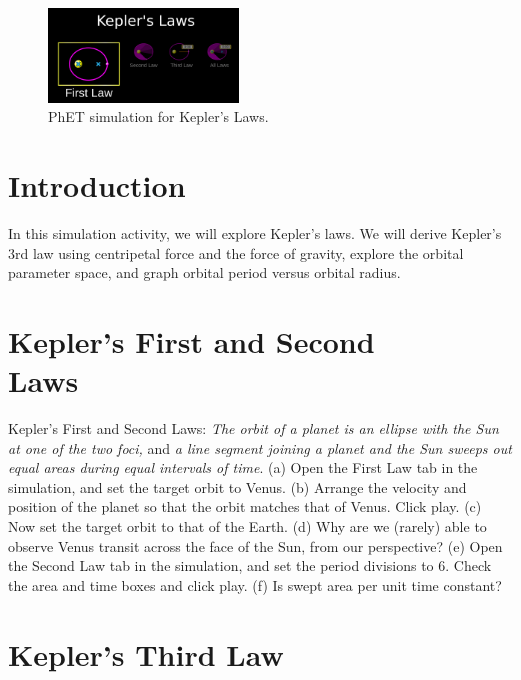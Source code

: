 \documentclass[12pt]{article}
\begin{document}
\twocolumn
\maketitle

\begin{figure}
\centering
\includegraphics[width=0.45\textwidth]{figures/kepler3.png}
\caption{\label{fig:1b} PhET simulation for Kepler's Laws.}
\end{figure}

\section{Introduction}

In this simulation activity, we will explore Kepler's laws.  We will derive Kepler's 3rd law using centripetal force and the force of gravity, explore the orbital parameter space, and graph orbital period versus orbital radius.

\section{Kepler's First and Second \\ Laws}

Kepler's First and Second Laws: \textit{The orbit of a planet is an ellipse with the Sun at one of the two foci,} and \textit{a line segment joining a planet and the Sun sweeps out equal areas during equal intervals of time}.  (a) Open the First Law tab in the simulation, and set the target orbit to Venus.  (b) Arrange the velocity and position of the planet so that the orbit matches that of Venus. Click play.  (c) Now set the target orbit to that of the Earth.  (d) Why are we (rarely) able to observe Venus transit across the face of the Sun, from our perspective? (e) Open the Second Law tab in the simulation, and set the period divisions to 6.  Check the area and time boxes and click play.  (f) Is swept area per unit time constant? \\ \vspace{2cm}

\section{Kepler's Third Law}
\end{document}

